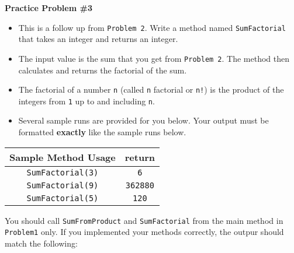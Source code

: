 \documentclass[12pt]{article}
\begin{document}
\noindent\textbf{Practice Problem \#3}
\begin{itemize}
	\item This is a follow up from \texttt{Problem 2}. Write a method named \texttt{SumFactorial} that takes an integer and returns an integer.
	\item The input value is the sum that you get from \texttt{Problem 2}. The method then calculates and returns the factorial of the sum.
	\item The factorial of a number \texttt{n} (called \texttt{n} factorial or \texttt{n!}) is the product of the integers from \texttt{1} up to and including \texttt{n}.
	\item Several sample runs are provided for you below. Your output must be formatted \textbf{exactly} like the sample runs below.
\end{itemize}
\begin{center}
\begin{tabular}{| c | c |}
\hline\rule{0pt}{4ex}
Sample Method Usage & return \\
\hline\rule{0pt}{4ex}
\texttt{SumFactorial(3)} & \texttt{6}\\
\hline\rule{0pt}{4ex}
\texttt{SumFactorial(9)} & \texttt{362880}\\
\hline\rule{0pt}{4ex}
\texttt{SumFactorial(5)} & \texttt{120}\\
\hline
\end{tabular}
\end{center}
\noindent You should call \texttt{SumFromProduct} and \texttt{SumFactorial} from the main method in \texttt{Problem1} only. If you implemented your methods correctly, the outpur should match the following:
\end{document}
